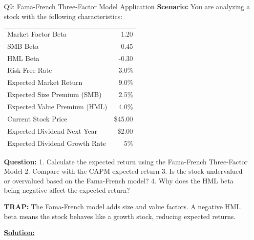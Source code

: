 \documentclass{beamer}
\renewcommand{\scriptsize}{\fontsize{6pt}{7pt}\selectfont}
\begin{document}
	\begin{frame}{Q9: Fama-French Three-Factor Model Application}
		\scriptsize
		\textbf{Scenario:} You are analyzing a stock with the following characteristics:
		
		\begin{tabular}{lr}
			Market Factor Beta & 1.20 \\
			SMB Beta & 0.45 \\
			HML Beta & -0.30 \\
			Risk-Free Rate & 3.0\% \\
			Expected Market Return & 9.0\% \\
			Expected Size Premium (SMB) & 2.5\% \\
			Expected Value Premium (HML) & 4.0\% \\
			Current Stock Price & \$45.00 \\
			Expected Dividend Next Year & \$2.00 \\
			Expected Dividend Growth Rate & 5\% \\
		\end{tabular}
		
		\textbf{Question:}
		1. Calculate the expected return using the Fama-French Three-Factor Model
		2. Compare with the CAPM expected return
		3. Is the stock undervalued or overvalued based on the Fama-French model?
		4. Why does the HML beta being negative affect the expected return?
		
		\vspace{2pt}
		\underline{\textbf{TRAP:}} The Fama-French model adds size and value factors. A negative HML beta means the stock behaves like a growth stock, reducing expected returns.
		
		\vspace{4pt}
		\underline{\textbf{Solution:}}
	\end{frame}
	
\end{document}
